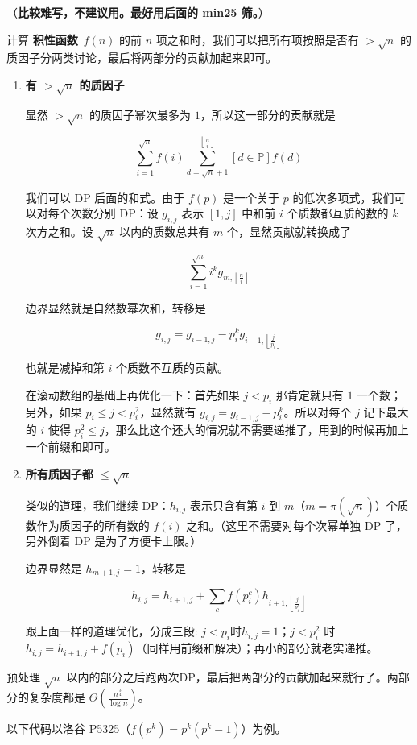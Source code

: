 （\textbf{比较难写，不建议用。最好用后面的 min25 筛。}）

计算 \textbf{积性函数}\ $f(n)$ 的前 $n$ 项之和时，我们可以把所有项按照是否有 $> \sqrt n$ 的质因子分两类讨论，最后将两部分的贡献加起来即可。

\begin{enumerate}
	
\item \textbf{有 $> \sqrt n$ 的质因子}

显然 $> \sqrt n$ 的质因子幂次最多为 $1$，所以这一部分的贡献就是

$$ \sum_{i = 1} ^ {\sqrt n} f(i) \sum_{d = \sqrt n + 1} ^ {\left\lfloor \frac n i \right\rfloor} \left[ d \in \mathbb{P} \right] f(d) $$

我们可以 DP 后面的和式。由于 $f(p)$ 是一个关于 $p$ 的低次多项式，我们可以对每个次数分别 DP：设 $g_{i, j}$ 表示 $[1, j]$ 中和前 $i$ 个质数都互质的数的 $k$ 次方之和。设 $\sqrt n$ 以内的质数总共有 $m$ 个，显然贡献就转换成了

$$ \sum_{i = 1} ^ {\sqrt n} i ^ k g_{m, \left\lfloor \frac n i \right\rfloor} $$

边界显然就是自然数幂次和，转移是

$$ g_{i, j} = g_{i - 1, j} - p_i ^ k g_{i - 1, \left\lfloor \frac j {p_i} \right\rfloor} $$

也就是减掉和第 $i$ 个质数不互质的贡献。

在滚动数组的基础上再优化一下：首先如果 $j < p_i$ 那肯定就只有 $1$ 一个数；另外，如果 $p_i \le j < p_i ^ 2$，显然就有 $g_{i, j} = g_{i - 1, j} - p_i ^ k$。所以对每个 $j$ 记下最大的 $i$ 使得 $p_i ^ 2 \le j$，那么比这个还大的情况就不需要递推了，用到的时候再加上一个前缀和即可。

\item \textbf{所有质因子都 $\le \sqrt n$}

类似的道理，我们继续 DP：$h_{i, j}$ 表示只含有第 $i$ 到 $m$（$m = \pi\left(\sqrt n\right)$）个质数作为质因子的所有数的 $f(i)$ 之和。（这里不需要对每个次幂单独 DP 了，另外倒着 DP 是为了方便卡上限。）

边界显然是 $h_{m + 1, j} = 1$，转移是

$$ h_{i, j} = h_{i + 1, j} + \sum_{c} f(p_i ^ c) h_{i + 1, \left\lfloor \frac j {p_i ^ c} \right\rfloor} $$

跟上面一样的道理优化，分成三段: $j < p_i$时$h_{i, j} = 1$；$j < p_i ^ 2$ 时 $h_{i, j} = h_{i + 1, j} + f(p_i)$（同样用前缀和解决）；再小的部分就老实递推。

\end{enumerate}

预处理 $\sqrt n$ 以内的部分之后跑两次DP，最后把两部分的贡献加起来就行了。两部分的复杂度都是 $\Theta \left( \frac {n ^ {\frac 3 4}} {\log n} \right)$。

以下代码以洛谷 P5325（$f(p^k) = p^k (p^k - 1)$）为例。

\inputminted{cpp}{../src/numbertheory/洲阁筛.cpp}
